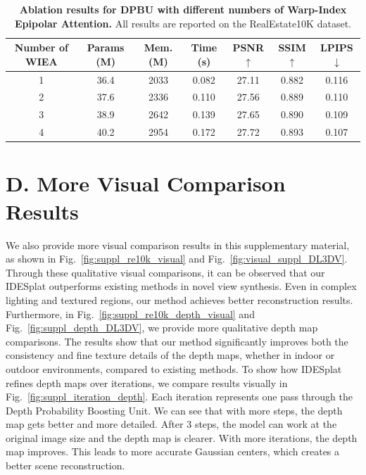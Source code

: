 \begin{table}[htbp]
    \footnotesize
    \vspace{-6mm}
    \centering
    \caption{\textbf{Ablation results for DPBU with different numbers of Warp-Index Epipolar Attention.}  All results are reported on the RealEstate10K dataset. 
    }
    \vspace{-2mm}
    \setlength{\tabcolsep}{1.2pt} %
    \begin{tabular}{c|ccc|ccc}
        \toprule
        Number of WIEA & Params (M) & Mem. (M) & Time (s) & PSNR$\uparrow$ & SSIM$\uparrow$ & LPIPS$\downarrow$ \\
        \midrule
        1           & 36.4 & 2033 & 0.082 & 27.11 & 0.882 & 0.116 \\
        2           & 37.6 & 2336 & 0.110 & 27.56 & 0.889 & 0.110 \\
        3           & 38.9 & 2642 & 0.139 & 27.65 & 0.890 & 0.109 \\
        4           & 40.2 & 2954 & 0.172 & 27.72 & 0.893 & 0.107 \\
        \bottomrule
    \end{tabular}
        \label{tab:ablation_DPBUs}
        \vspace{-6mm}
\end{table}





\section*{D. More Visual Comparison Results}
\label{sec:more_exp_results}

We also provide more visual comparison results in this supplementary material, as shown in Fig.~\ref{fig:suppl_re10k_visual} and Fig.~\ref{fig:visual_suppl_DL3DV}. Through these qualitative visual comparisons, it can be observed that our IDESplat outperforms existing methods in novel view synthesis. Even in complex lighting and textured regions, our method achieves better reconstruction results. Furthermore, in Fig.~\ref{fig:suppl_re10k_depth_visual} and Fig.~\ref{fig:suppl_depth_DL3DV}, we provide more qualitative depth map comparisons. The results show that our method significantly improves both the consistency and fine texture details of the depth maps, whether in indoor or outdoor environments, compared to existing methods.
%
To show how IDESplat refines depth maps over iterations, we compare results visually in Fig.~\ref{fig:suppl_iteration_depth}. Each iteration represents one pass through the Depth Probability Boosting Unit.
%
We can see that with more steps, the depth map gets better and more detailed. After 3 steps, the model can work at the original image size and the depth map is clearer.
%
With more iterations, the depth map improves. This leads to more accurate Gaussian centers, which creates a better scene reconstruction.



